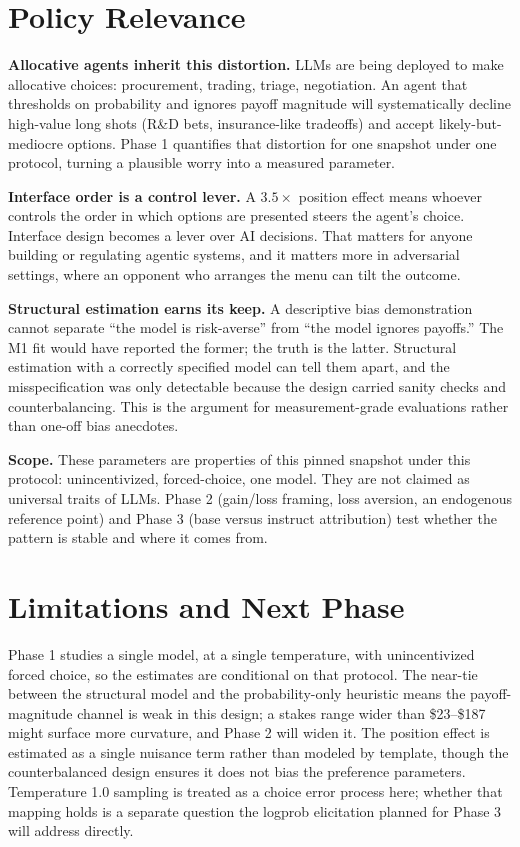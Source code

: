 \documentclass[11pt]{article}
\begin{document}
\section{Policy Relevance}

\textbf{Allocative agents inherit this distortion.} LLMs are being deployed to make allocative choices:
procurement, trading, triage, negotiation. An agent that thresholds on probability and ignores payoff
magnitude will systematically decline high-value long shots (R\&D bets, insurance-like tradeoffs) and
accept likely-but-mediocre options. Phase 1 quantifies that distortion for one snapshot under one
protocol, turning a plausible worry into a measured parameter.

\textbf{Interface order is a control lever.} A $3.5\times$ position effect means whoever controls the
order in which options are presented steers the agent's choice. Interface design becomes a lever over
AI decisions. That matters for anyone building or regulating agentic systems, and it matters more in
adversarial settings, where an opponent who arranges the menu can tilt the outcome.

\textbf{Structural estimation earns its keep.} A descriptive bias demonstration cannot separate ``the
model is risk-averse'' from ``the model ignores payoffs.'' The M1 fit would have reported the former;
the truth is the latter. Structural estimation with a correctly specified model can tell them apart,
and the misspecification was only detectable because the design carried sanity checks and
counterbalancing. This is the argument for measurement-grade evaluations rather than one-off bias
anecdotes.

\textbf{Scope.} These parameters are properties of this pinned snapshot under this protocol:
unincentivized, forced-choice, one model. They are not claimed as universal traits of LLMs. Phase 2
(gain/loss framing, loss aversion, an endogenous reference point) and Phase 3 (base versus instruct
attribution) test whether the pattern is stable and where it comes from.

\section{Limitations and Next Phase}

Phase 1 studies a single model, at a single temperature, with unincentivized forced choice, so the
estimates are conditional on that protocol. The near-tie between the structural model and the
probability-only heuristic means the payoff-magnitude channel is weak in this design; a stakes range
wider than \$23--\$187 might surface more curvature, and Phase 2 will widen it. The position effect is
estimated as a single nuisance term rather than modeled by template, though the counterbalanced design
ensures it does not bias the preference parameters. Temperature 1.0 sampling is treated as a choice
error process here; whether that mapping holds is a separate question the logprob elicitation planned
for Phase 3 will address directly.
\end{document}
